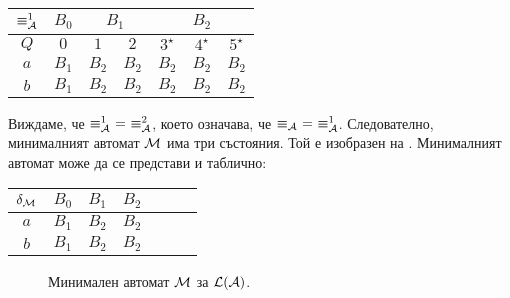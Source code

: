 \begin{extra2}
\begin{example}
\begin{itemize}
    \begin{tabular}{|c|c|c|c|c|c|c|}
      \hline
      $\equiv^1_{\mathcal{A}}$ & $B_0$ & \multicolumn{2}{|c|}{$B_1$} & \multicolumn{3}{|c|}{$B_2$}\\
      \hline
      \hline
      $Q$ & $0$ & $1$ & $2$ & $3^\star$ & $4^\star$ & $5^\star$ \\
      \hline
      $a$ & $B_1$ & $B_2$ & $B_2$ & $B_2$ & $B_2$ & $B_2$\\
      \hline
      $b$ & $B_1$ & $B_2$ & $B_2$ & $B_2$ & $B_2$ & $B_2$\\
      \hline
    \end{tabular}

    
    Виждаме, че $\equiv^1_\A\ =\ \equiv^2_\A$,
    което означава, че $\equiv_{\mathcal{A}}\ =\ \equiv^1_{\mathcal{A}}$.
    Следователно, минималният автомат $\mathcal{M}$ има три състояния.
    Той е изобразен на .  
    Минималният автомат може да се представи и таблично:
  
    \begin{tabular}{|c|c|c|c|c|c|c|}
      \hline
      $\delta_{\mathcal{M}}$ & $B_0$ & $B_1$ & $B_2$ \\
      \hline
      $a$ & $B_1$ & $B_2$ & $B_2$ \\
      \hline
      $b$ & $B_1$ & $B_2$ & $B_2$ \\
      \hline
    \end{tabular}
  \end{itemize}
  
  \begin{figure}[H]
    \centering
  \caption{Минимален автомат $\mathcal{M}$ за $\mathcal{L}(\mathcal{A})$.}
  \label{fig:min1}
\end{figure}
\end{example}
\end{extra2}

\vspace*{1cm}

